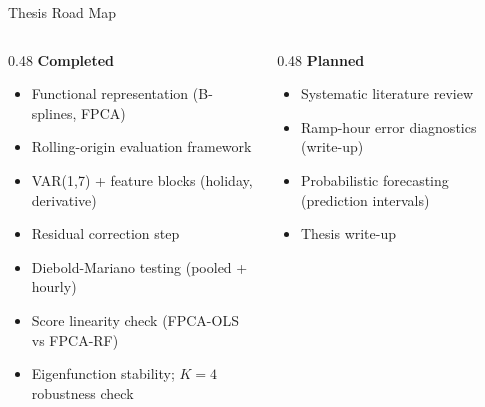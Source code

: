 \documentclass[10pt,aspectratio=169]{beamer}
\begin{document}
\begin{frame}{Thesis Road Map}
  \begin{columns}
    \begin{column}{0.48\textwidth}
      \textbf{\textcolor{accentblue}{Completed}}
      \vspace{0.3em}
      \begin{itemize}
        \item[$\checkmark$] Functional representation (B-splines, FPCA)
        \item[$\checkmark$] Rolling-origin evaluation framework
        \item[$\checkmark$] VAR(1,7) + feature blocks (holiday, derivative)
        \item[$\checkmark$] Residual correction step
        \item[$\checkmark$] Diebold-Mariano testing (pooled + hourly)
        \item[$\checkmark$] Score linearity check (FPCA-OLS vs FPCA-RF)
        \item[$\checkmark$] Eigenfunction stability; $K=4$ robustness check
      \end{itemize}
    \end{column}
    \begin{column}{0.48\textwidth}
      \textbf{\textcolor{accentred}{Planned}}
      \vspace{0.3em}
      \begin{itemize}
        \item[$\square$] Systematic literature review
        \item[$\square$] Ramp-hour error diagnostics (write-up)
        \item[$\square$] Probabilistic forecasting (prediction intervals)
        \item[$\square$] Thesis write-up
      \end{itemize}
    \end{column}
  \end{columns}
\end{frame}
\end{document}
